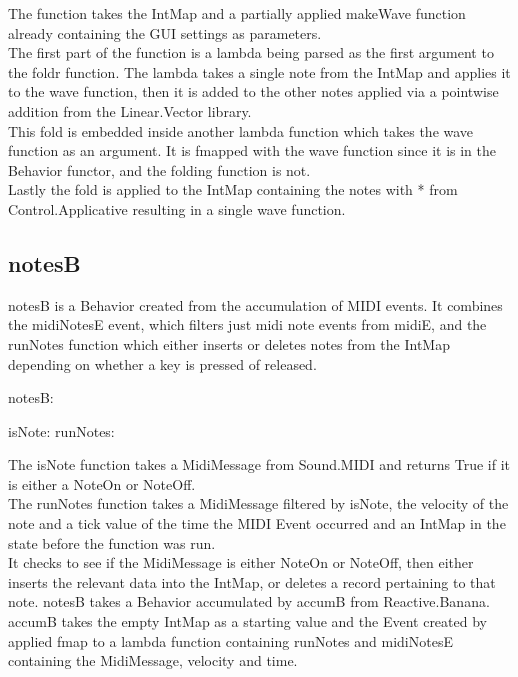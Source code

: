 \documentclass[11pt,a4paper]{article}
\begin{document}


The function takes the IntMap and a partially applied makeWave function already containing the GUI settings as parameters. \\
The first part of the function is a lambda being parsed as the first argument to the foldr function. The lambda takes a single note from the IntMap and applies it to the wave function, then it is added to the other notes applied via a pointwise addition from the Linear.Vector library. \\
This fold is embedded inside another lambda function which takes the wave function as an argument. It is fmapped with the wave function since it is in the Behavior functor, and the folding function is not. \\ 
Lastly the fold is applied to the IntMap containing the notes with \textlangle{}*\textrangle{} from Control.Applicative resulting in a single wave function.

\subsection{notesB}
notesB is a Behavior created from the accumulation of MIDI events. It combines the midiNotesE event, which filters just midi note events from midiE, and the runNotes function which either inserts or deletes notes from the IntMap depending on whether a key is pressed of released.

\pagebreak

notesB:
 
isNote:
 runNotes:


The isNote function takes a MidiMessage from Sound.MIDI and returns True if it is either a NoteOn or NoteOff. \\
The runNotes function takes a MidiMessage filtered by isNote, the velocity of the note and a tick value of the time the MIDI Event occurred and an IntMap in the state before the function was run. \\
It checks to see if the MidiMessage is either NoteOn or NoteOff, then either inserts the relevant data into the IntMap, or deletes a record pertaining to that note.
notesB takes a Behavior accumulated by accumB from Reactive.Banana. accumB takes the empty IntMap as a starting value and the Event created by applied fmap to a lambda function containing runNotes and midiNotesE containing the MidiMessage, velocity and time.
\end{document}
